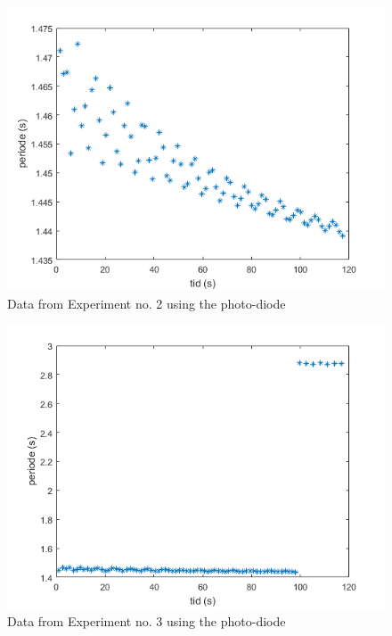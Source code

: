 \documentclass[%
 reprint,
 amsmath,amssymb,
 aps,
]{revtex4-1}
\begin{document}
        \begin{figure}[h!]
        	\center
        	\includegraphics[scale=0.6]{forsok2fig1}
        	\caption{Data from Experiment no. 2 using the photo-diode}
            \label{fig:data2}
        \end{figure}

        \begin{figure}[h!]
        	\center
        	\includegraphics[scale=0.6]{forsok3fig1}
        	\caption{Data from Experiment no. 3 using the photo-diode}
            \label{fig:data3}
        \end{figure}
\end{document}
